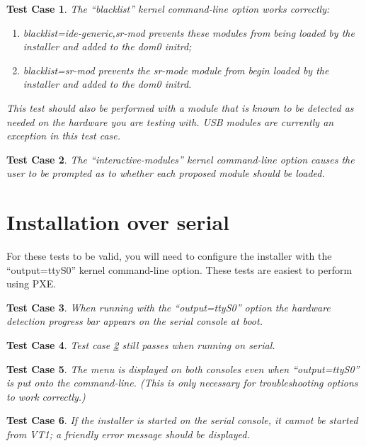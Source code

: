 \documentclass[a4paper]{article}
\newtheorem{testcase}{Test Case}
\begin{document}
\begin{testcase}
The ``blacklist'' kernel command-line option works correctly:
\begin{enumerate}
\item blacklist=ide-generic,sr-mod prevents these modules from being
  loaded by the installer and added to the dom0 initrd;
\item blacklist=sr-mod prevents the sr-mode module from begin loaded
  by the installer and added to the dom0 initrd.
\end{enumerate}
This test should also be performed with a module that is known to be
detected as needed on the hardware you are testing with.  USB modules
are currently an exception in this test case.
\end{testcase}

\begin{testcase} \label{tc:interactive-modules}
The ``interactive-modules'' kernel command-line option causes the user
to be prompted as to whether each proposed module should be loaded.
\end{testcase}

\section{Installation over serial}

For these tests to be valid, you will need to configure the installer
with the ``output=ttyS0'' kernel command-line option.  These tests are
easiest to perform using PXE.

\begin{testcase}
When running with the ``output=ttyS0'' option the hardware detection
progress bar appears on the serial console at boot.
\end{testcase}

\begin{testcase}
Test case \ref{tc:interactive-modules} still passes when running on serial.
\end{testcase}

\begin{testcase}
The menu is displayed on both consoles even when ``output=ttyS0'' is
put onto the command-line.  (This is only necessary for
troubleshooting options to work correctly.)
\end{testcase}

\begin{testcase}
If the installer is started on the serial console, it cannot be
started from VT1; a friendly error message should be displayed.
\end{testcase}
\end{document}
